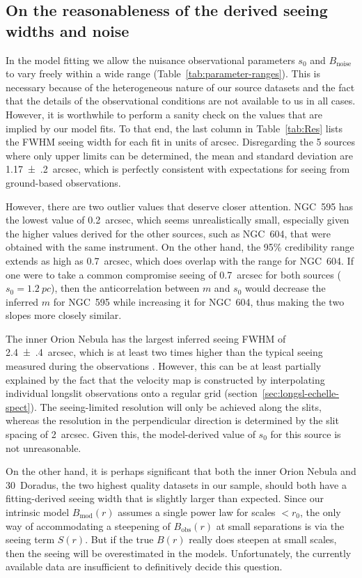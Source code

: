 \documentclass[fleqn,usenatbib, useAMS, a4paper]{mnras}
\newcommand\noise{\ensuremath{_{\text{noise}}}}
\newcommand\obs{\ensuremath{_{\mathrm{obs}}}}
\newcommand\model{\ensuremath{_{\mathrm{mod}}}}
\begin{document}
\subsection{On the reasonableness of the derived seeing widths and noise}
\label{sec:sanity-check-derived}
In the model fitting we allow the nuisance observational parameters
\(s_0\) and \(B\noise\) to vary freely within a wide range
(Table~\ref{tab:parameter-ranges}).
This is necessary because of the heterogeneous nature of our source datasets
and the fact that the details of the observational conditions
are not available to us in all cases.
However, it is worthwhile to perform a sanity check on the values that are implied by our model fits.
To that end, the last column in Table~\ref{tab:Res} lists the FWHM seeing width for each fit in units of arcsec.
Disregarding the 5 sources where only upper limits can be determined,
the mean and standard deviation are \SI{1.17(20)}{arcsec},
which is perfectly consistent with expectations for seeing from ground-based observations.

However, there are two outlier values that deserve closer attention.
NGC~595 has the lowest value of \SI{0.2}{arcsec}, which seems
unrealistically small, especially given the higher values
derived for the other sources, such as NGC~604,
that were obtained with the same instrument.
On the other hand, the 95\% credibility range extends as high as \SI{0.7}{arcsec},
which does overlap with the range for NGC~604.
If one were to take a common compromise seeing of \SI{0.7}{arcsec}
for both sources (\(s_0 = \SI{1.2}{pc}\)),
then the anticorrelation between \(m\) and \(s_0\)
would decrease the inferred \(m\) for NGC~595 while increasing it for NGC~604,
thus making the two slopes more closely similar. 

The inner Orion Nebula has the largest inferred seeing FWHM of \SI{2.4(4)}{arcsec},
which is at least two times higher than the typical seeing measured during the observations
\citep{Doi:2004a}.
However, this can be at least partially explained by the fact that the velocity map is constructed
by interpolating individual longslit observations onto a regular grid
(section~\ref{sec:longsl-echelle-spect}).
The seeing-limited resolution will only be achieved along the slits,
whereas the resolution in the perpendicular direction is determined by the slit spacing of \SI{2}{arcsec}.
Given this, the model-derived value of \(s_0\) for this source is not unreasonable.

On the other hand, it is perhaps significant that both
the inner Orion Nebula and 30~Doradus,
the two highest quality datasets in our sample,
should both have a fitting-derived seeing width that is
slightly larger than expected.
Since our intrinsic model \(B\model(r)\) assumes a single power law
for scales \(<r_0\),
the only way of accommodating a steepening of \(B\obs(r)\) at small separations
is via the seeing term \(S(r)\).
But if the true \(B(r)\) really does steepen at small scales,
then the seeing will be overestimated in the models.
Unfortunately, the currently available data are insufficient to
definitively decide this question.
\end{document}
